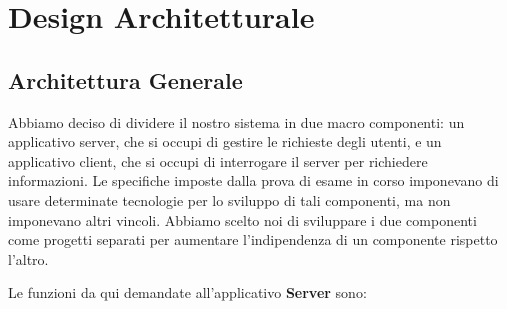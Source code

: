 

\chapter{Design Architetturale}

    \section{Architettura Generale}
    
    Abbiamo deciso di dividere il nostro sistema in due macro componenti: un applicativo server, che si occupi di gestire le richieste degli utenti, e un applicativo client, che si occupi di interrogare il server per richiedere informazioni. Le specifiche imposte dalla prova di esame in corso imponevano di usare determinate tecnologie per lo sviluppo di tali componenti, ma non imponevano altri vincoli. Abbiamo scelto noi di sviluppare i due componenti come progetti separati per aumentare l'indipendenza di un componente rispetto l'altro.
    
    \par Le funzioni da qui demandate all'applicativo \textbf{Server} sono:
    
